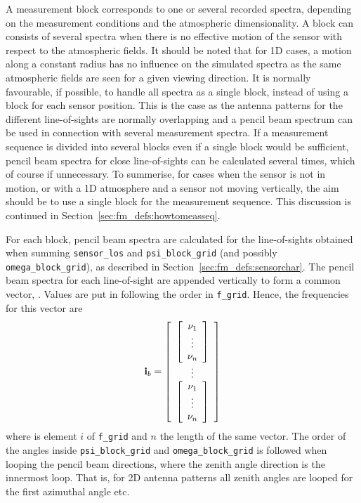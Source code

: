 A measurement block corresponds to one or several recorded spectra,
depending on the measurement conditions and the atmospheric
dimensionality. A block can consists of several spectra when there is
no effective motion of the sensor with respect to the atmospheric
fields. It should be noted that for 1D cases, a motion along a
constant radius has no influence on the simulated spectra as the same
atmospheric fields are seen for a given viewing direction. It is
normally favourable, if possible, to handle all spectra as a single
block, instead of using a block for each sensor position. This is the
case as the antenna patterns for the different line-of-sights are
normally overlapping and a pencil beam spectrum can be used in
connection with several measurement spectra. If a measurement sequence
is divided into several blocks even if a single block would be
sufficient, pencil beam spectra for close line-of-sights can be
calculated several times, which of course if unnecessary.  To
summerise, for cases when the sensor is not in motion, or with a 1D
atmosphere and a sensor not moving vertically, the aim should be to
use a single block for the measurement sequence. This discussion is
continued in Section~\ref{sec:fm_defs:howtomeasseq}.

For each block, pencil beam spectra are calculated for the
line-of-sights obtained when summing \verb|sensor_los| and
\verb|psi_block_grid| (and possibly \verb|omega_block_grid|), as
described in Section~\ref{sec:fm_defs:sensorchar}. The pencil beam
spectra for each line-of-sight are appended vertically to form a
common vector, . Values are put in following the order
in \verb|f_grid|. Hence, the frequencies for this vector are
\begin{equation}
  \mathbf{i}_{b} = 
  \left[ \begin{array}{c} 
     \left[
          \begin{array}{c} \nu_{1}\\\vdots\\\nu_{n} \end{array} 
     \right] \\
     \vdots \\
     \left[
          \begin{array}{c} \nu_{1}\\\vdots\\\nu_{n} \end{array} 
     \right]
     \end{array} \right]
  \label{eq:fm_defs:freqs_of_ib}
\end{equation}
where  is element $i$ of \verb|f_grid| and $n$ the length of
the same vector. The order of the angles inside \verb|psi_block_grid|
and \verb|omega_block_grid| is followed when looping the pencil beam
directions, where the zenith angle direction is the innermost loop.
That is, for 2D antenna patterns all zenith angles are looped for the
first azimuthal angle etc.

